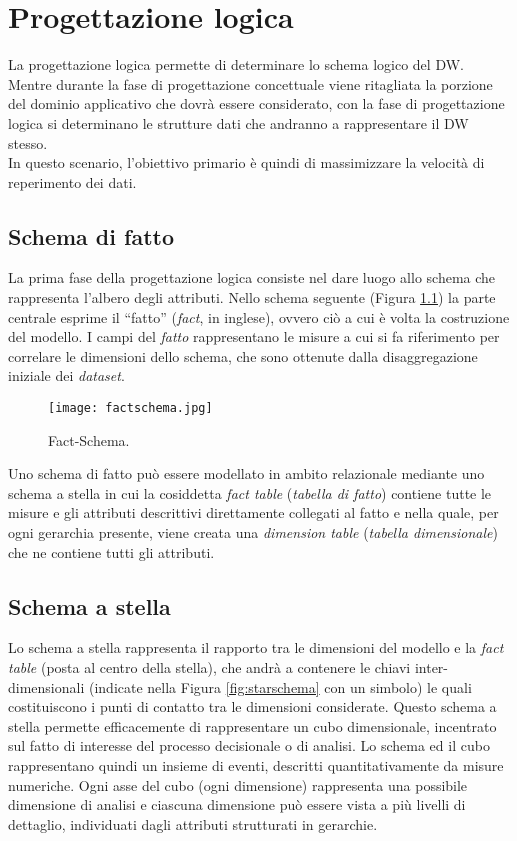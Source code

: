 \chapter{Progettazione logica} \label{chap:progettazione_logica}
	
	La progettazione logica permette di determinare lo schema logico del DW. Mentre durante la fase di progettazione concettuale viene ritagliata la porzione del dominio applicativo che dovrà essere considerato, con la fase di progettazione logica si determinano le strutture dati che andranno a rappresentare il DW stesso.\\
	In questo scenario, l'obiettivo primario è quindi di massimizzare la velocità di reperimento dei dati.\\
	
	\section{Schema di fatto} \label{sec:schema_fatto}
		La prima fase della progettazione logica consiste nel dare luogo allo schema che rappresenta l'albero degli attributi. Nello schema seguente (Figura \ref{fig:factschema}) la parte centrale esprime il ``fatto'' (\textit{fact}, in inglese), ovvero ciò a cui è volta la costruzione del modello. I campi del \textit{fatto} rappresentano le misure a cui si fa riferimento per correlare le dimensioni dello schema, che sono ottenute dalla disaggregazione iniziale dei \textit{dataset}.
		
		
		\begin{figure}[h!]
			\centering
				\texttt{[image: factschema.jpg]}
			\caption{Fact-Schema.}
			\label{fig:factschema}
		\end{figure}
		
		
		Uno schema di fatto può essere modellato in ambito relazionale mediante uno schema a stella in cui la cosiddetta \textit{fact table} (\textit{tabella di fatto}) contiene tutte le misure e gli attributi descrittivi direttamente collegati al fatto e nella quale, per ogni gerarchia presente, viene creata una \textit{dimension table} (\textit{tabella dimensionale}) che ne contiene tutti gli attributi.
	
	\section{Schema a stella} \label{sec:schema_stella}
	
		Lo schema a stella rappresenta il rapporto tra le dimensioni del modello e la \textit{fact table} (posta al centro della stella), che andrà a contenere le chiavi inter-dimensionali (indicate nella Figura \ref{fig:starschema} con un simbolo) le quali costituiscono i punti di contatto tra le dimensioni considerate.
		Questo schema a stella permette efficacemente di rappresentare un cubo dimensionale, incentrato sul fatto di interesse del processo decisionale o di analisi. Lo schema ed il cubo rappresentano quindi un insieme di eventi, descritti quantitativamente da misure numeriche. Ogni asse del cubo (ogni dimensione) rappresenta una possibile dimensione di analisi e ciascuna dimensione può essere vista a più livelli di dettaglio, individuati dagli attributi strutturati in gerarchie.
		
